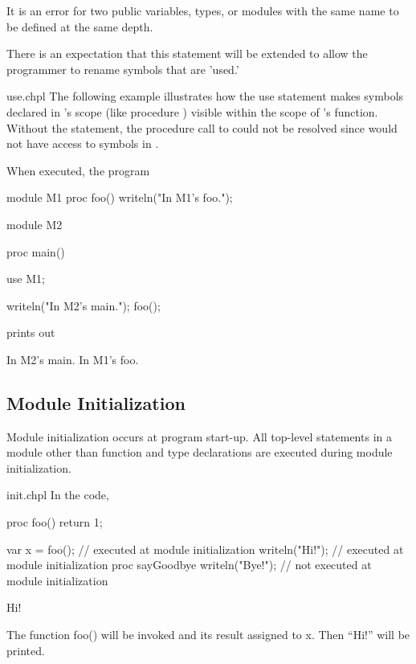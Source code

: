 It is an error for two public variables, types, or modules with the same
name to be defined at the same depth.

\begin{openissue}
There is an expectation that this statement will be extended to allow
the programmer to rename symbols that are 'used.'
\end{openissue}

\begin{chapelexample}{use.chpl}
  The following example illustrates how the use statement makes
  symbols declared in 's scope (like procedure
  ) visible within the scope of 's 
  function.  Without the  statement, the procedure call to
   could not be resolved since  would not have
  access to symbols in .

  When executed, the program
\begin{chapel}
module M1 {
  proc foo() {
    writeln("In M1's foo.");
  }
}

module M2 {
  proc main() {
    use M1;

    writeln("In M2's main.");
    foo();
  }
}
\end{chapel}
prints out
\begin{chapelprintoutput}{}
In M2's main.
In M1's foo.
\end{chapelprintoutput}
\end{chapelexample}



\subsection{Module Initialization}
\label{Module_Initialization}

Module initialization occurs at program start-up.  All top-level
statements in a module other than function and type declarations are
executed during module initialization.

\begin{chapelexample}{init.chpl}
In the code,
\begin{chapelpre}
proc foo() {
    return 1;
}
\end{chapelpre}
\begin{chapel}
var x = foo();       // executed at module initialization
writeln("Hi!");      // executed at module initialization
proc sayGoodbye {
  writeln("Bye!");   // not executed at module initialization
}
\end{chapel}
\begin{chapeloutput}
Hi!
\end{chapeloutput}
The function foo() will be invoked and its result assigned to x.  Then
``Hi!'' will be printed.
\end{chapelexample}

